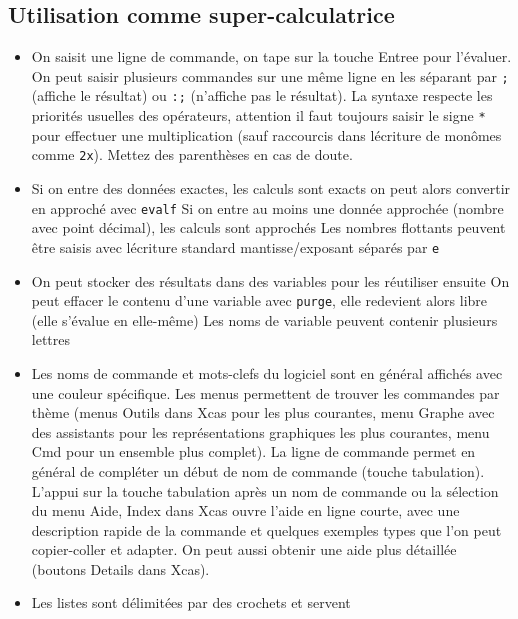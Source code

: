 \documentclass[a4paper,11pt]{article}
\begin{document}
\begin{giacjshere}
\subsection{Utilisation comme super-calculatrice}
\begin{itemize}
\item 
On saisit une ligne de commande, on tape sur la touche Entree pour
l'\'evaluer. On peut saisir plusieurs commandes sur une m\^eme ligne
en les s\'eparant par \verb|;| (affiche le r\'esultat) ou
\verb|:;| (n'affiche pas le r\'esultat).
La syntaxe respecte les priorit\'es usuelles des 
op\'erateurs, attention il faut toujours saisir le signe \verb|*|
pour effectuer une multiplication (sauf raccourcis dans l\'ecriture
de mon\^omes comme \verb|2x|). Mettez des parenth\`eses en cas de doute.
\item 
Si on entre des donn\'ees exactes, les calculs sont exacts
on peut alors convertir en approch\'e avec \verb|evalf|
Si on entre au moins une donn\'ee approch\'ee (nombre avec point
d\'ecimal), les calculs sont approch\'es
Les nombres flottants peuvent \^etre saisis avec l\'ecriture standard
mantisse/exposant s\'epar\'es par \verb|e|
\item On peut stocker des r\'esultats dans des variables
pour les r\'eutiliser ensuite
On peut effacer le contenu d'une variable avec \verb|purge|, elle
redevient alors libre (elle s'\'evalue en elle-m\^eme)
Les noms de variable peuvent contenir plusieurs lettres
\item Les noms de commande et mots-clefs du logiciel sont en g\'en\'eral
affich\'es avec une couleur sp\'ecifique. Les menus permettent
de trouver les commandes par th\`eme (menus Outils dans Xcas pour
les plus courantes, menu Graphe avec des assistants pour les 
repr\'esentations graphiques les plus courantes, 
menu Cmd pour un ensemble plus
complet). La ligne de commande permet
en g\'en\'eral de compl\'eter un d\'ebut de nom de commande (touche
tabulation). L'appui sur la touche tabulation apr\`es
un nom de commande ou la s\'election du menu Aide, Index dans
Xcas ouvre l'aide en ligne
courte, avec une description rapide de la commande et
quelques exemples types que l'on peut copier-coller et adapter.
On peut aussi obtenir une aide plus d\'etaill\'ee (boutons Details
dans Xcas).
\item Les listes sont d\'elimit\'ees par des crochets et servent

\end{itemize}
\end{giacjshere}
\end{document}
